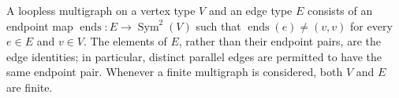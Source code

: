 \begin{definition}
A loopless multigraph on a vertex type $V$ and an edge type $E$ consists of
an endpoint map $\operatorname{ends}:E\to\operatorname{Sym}^2(V)$ such that
$\operatorname{ends}(e)\ne(v,v)$ for every $e\in E$ and $v\in V$.
The elements of $E$, rather than their endpoint pairs, are the edge
identities; in particular, distinct parallel edges are permitted to have the
same endpoint pair.  Whenever a finite multigraph is considered, both $V$
and $E$ are finite.
\end{definition}

